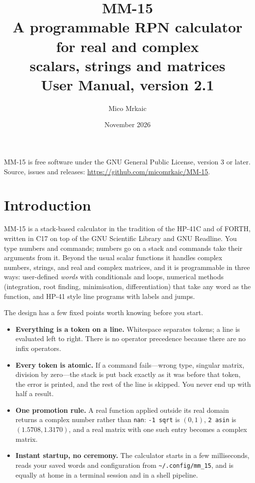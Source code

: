 \documentclass[11pt,letterpaper]{article}
\title{\sffamily\Huge MM-15\\[0.3em]\Large A programmable RPN calculator for real and complex\\scalars, strings and matrices\\[1em]\large User Manual, version 2.1}
\author{Mico Mrkaic}
\date{November 2026}
\newcommand{\code}[1]{\texttt{#1}}
\begin{document}
\maketitle
\thispagestyle{empty}

\begin{center}
\begin{minipage}{0.8\textwidth}
\small
MM-15 is free software under the GNU General Public License, version 3 or later.
Source, issues and releases: \url{https://github.com/micomrkaic/MM-15}.
\end{minipage}
\end{center}

\vfill
\tableofcontents
\clearpage

\section{Introduction}

MM-15 is a stack-based calculator in the tradition of the HP-41C and of FORTH, written in C17 on top of the GNU Scientific Library and GNU Readline. You type numbers and commands; numbers go on a stack and commands take their arguments from it. Beyond the usual scalar functions it handles complex numbers, strings, and real and complex matrices, and it is programmable in three ways: user-defined \emph{words} with conditionals and loops, numerical methods (integration, root finding, minimisation, differentiation) that take any word as the function, and HP-41 style line programs with labels and jumps.

The design has a few fixed points worth knowing before you start.

\begin{itemize}
  \item \textbf{Everything is a token on a line.} Whitespace separates tokens; a line is evaluated left to right. There is no operator precedence because there are no infix operators.
  \item \textbf{Every token is atomic.} If a command fails---wrong type, singular matrix, division by zero---the stack is put back exactly as it was before that token, the error is printed, and the rest of the line is skipped. You never end up with half a result.
  \item \textbf{One promotion rule.} A real function applied outside its real domain returns a complex number rather than \code{nan}: \code{-1 sqrt} is $(0,1)$, \code{2 asin} is $(1.5708, 1.3170)$, and a real matrix with one such entry becomes a complex matrix.
  \item \textbf{Instant startup, no ceremony.} The calculator starts in a few milliseconds, reads your saved words and configuration from \code{\textasciitilde/.config/mm\_15}, and is equally at home in a terminal session and in a shell pipeline.
\end{itemize}
\end{document}
